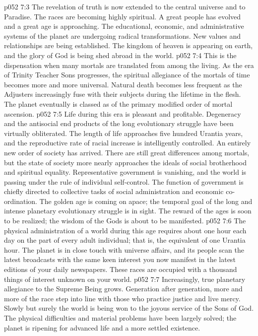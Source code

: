 \vs p052 7:3 \pc The revelation of truth is now extended to the central universe and to Paradise. The races are becoming highly spiritual. A great people has evolved and a great age is approaching. The educational, economic, and administrative systems of the planet are undergoing radical transformations. New values and relationships are being established. The kingdom of heaven is appearing on earth, and the glory of God is being shed abroad in the world.
\vs p052 7:4 This is the dispensation when many mortals are translated from among the living. As the era of Trinity Teacher Sons progresses, the spiritual allegiance of the mortals of time becomes more and more universal. Natural death becomes less frequent as the Adjusters increasingly fuse with their subjects during the lifetime in the flesh. The planet eventually is classed as of the primary modified order of mortal ascension.
\vs p052 7:5 \pc Life during this era is pleasant and profitable. Degeneracy and the antisocial end products of the long evolutionary struggle have been virtually obliterated. The length of life approaches five hundred Urantia years, and the reproductive rate of racial increase is intelligently controlled. An entirely new order of society has arrived. There are still great differences among mortals, but the state of society more nearly approaches the ideals of social brotherhood and spiritual equality. Representative government is vanishing, and the world is passing under the rule of individual self\hyp{}control. The function of government is chiefly directed to collective tasks of social administration and economic co\hyp{}ordination. The golden age is coming on apace; the temporal goal of the long and intense planetary evolutionary struggle is in sight. The reward of the ages is soon to be realized; the wisdom of the Gods is about to be manifested.
\vs p052 7:6 The physical administration of a world during this age requires about one hour each day on the part of every adult individual; that is, the equivalent of one Urantia hour. The planet is in close touch with universe affairs, and its people scan the latest broadcasts with the same keen interest you now manifest in the latest editions of your daily newspapers. These races are occupied with a thousand things of interest unknown on your world.
\vs p052 7:7 \pc Increasingly, true planetary allegiance to the Supreme Being grows. Generation after generation, more and more of the race step into line with those who practice justice and live mercy. Slowly but surely the world is being won to the joyous service of the Sons of God. The physical difficulties and material problems have been largely solved; the planet is ripening for advanced life and a more settled existence.
